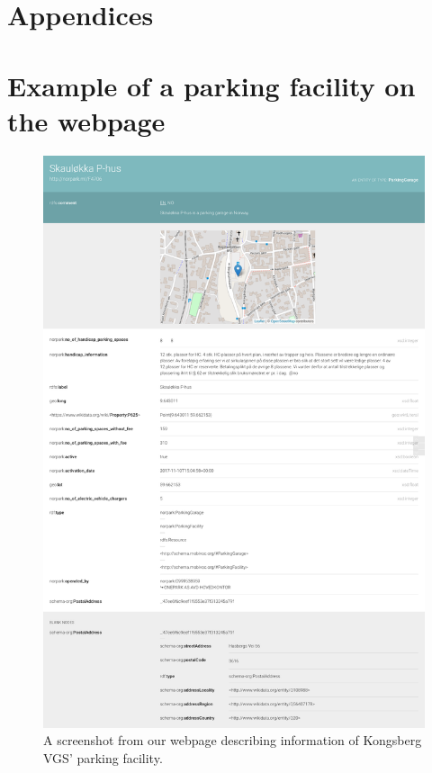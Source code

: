 \chapter*{Appendices}
\appendix

\chapter{Example of a parking facility on the webpage}
\label{appendix:webpage}
\begin{figure}[H]
	\centering
	\includegraphics[scale=0.20]{figures/parking-place-screenshot.png}
	\caption{A screenshot from our webpage describing information of Kongsberg VGS' parking facility.}
\end{figure}

